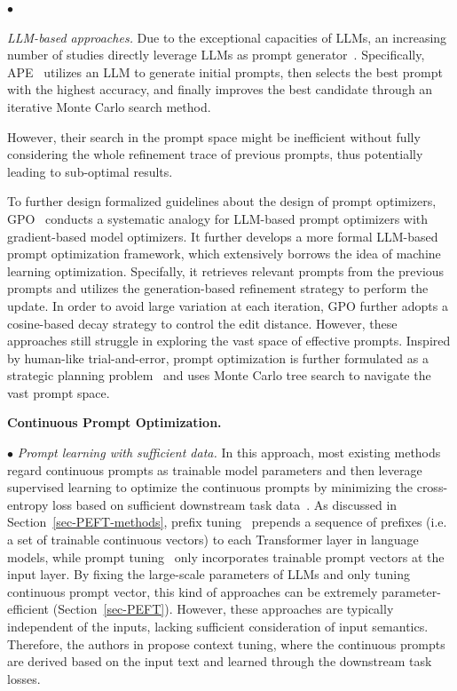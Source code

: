 {{{{{{$\bullet$  {\textit{LLM-based approaches.} Due to the exceptional capacities of LLMs, an increasing number of studies directly leverage LLMs as prompt generator~\cite{Zhou-ICLR-2023-Large,Pryzant-CoRR-2023-Automatic,Yang-CoRR-2023-Large,Ye-arxiv-2023-prompt,Tang-arxiv-2024-unleashing,Yang-EMNLP-2023-InstOptima,Guo-arxiv-2023-connecting,Do-arxiv-2023-prompt}. Specifically, APE~\cite{Zhou-ICLR-2023-Large} utilizes an LLM to generate initial prompts, then selects the best prompt with the highest accuracy, and finally improves the best candidate through an iterative Monte Carlo search method.

However, their search in the prompt space might be inefficient {without fully considering the whole refinement trace of previous prompts}, thus potentially leading to sub-optimal results. 

To further design formalized guidelines about the design of prompt optimizers, GPO~\cite{Tang-arxiv-2024-unleashing} conducts a systematic analogy for LLM-based prompt optimizers with gradient-based model optimizers. It further develops a {more formal} LLM-based prompt optimization framework, which extensively borrows the idea of machine learning optimization. Specifally, it retrieves relevant prompts from the previous prompts and utilizes the generation-based refinement strategy to perform the update. In order to avoid large variation at each iteration, GPO further adopts a cosine-based decay strategy to control the edit distance. However, these approaches still struggle in exploring the vast space of effective prompts. Inspired by human-like trial-and-error, prompt optimization is further formulated as a strategic planning problem~\cite{Wang-CoRR-2023-PromptAgent} and uses Monte Carlo tree search to navigate the vast prompt space.}

\textbf{Continuous Prompt Optimization.} 

$\bullet$ {\textit{Prompt learning  with sufficient data.} In this approach, most existing methods regard continuous prompts as trainable model parameters and then leverage supervised learning to optimize the continuous prompts by minimizing the cross-entropy loss based on sufficient downstream task data~\cite{Li-ACL-2021-prefix,Lester-ACL-2021-The,Tang-COLING-2022-Context,Liu-arXiv-2021-P-tuning}. As discussed in Section~\ref{sec-PEFT-methods}, prefix tuning~\cite{Li-ACL-2021-prefix} prepends a sequence of prefixes (i.e. a set of trainable continuous vectors) to each Transformer layer in language models, while prompt tuning~\cite{Lester-ACL-2021-The} only incorporates trainable prompt vectors at the input layer. By fixing the large-scale parameters of LLMs and only tuning continuous prompt vector, this kind of approaches can be extremely parameter-efficient (Section~\ref{sec-PEFT}). However, these approaches are typically independent of the inputs, lacking sufficient consideration of input semantics. Therefore, the authors in \cite{Tang-COLING-2022-Context} propose context tuning, where the continuous prompts are derived based on the input text and learned through the downstream task losses.}

}}}}}}

